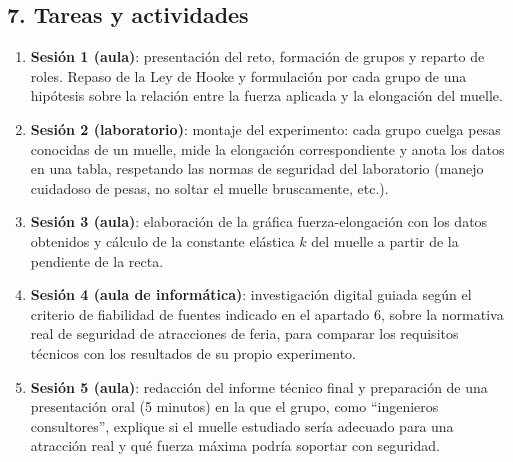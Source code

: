 \documentclass[11pt,a4paper]{article}
\begin{document}
\subsection*{7. Tareas y actividades}
\begin{enumerate}
    \item \textbf{Sesión 1 (aula)}: presentación del reto, formación de grupos y reparto de roles. Repaso de la Ley de Hooke y formulación por cada grupo de una hipótesis sobre la relación entre la fuerza aplicada y la elongación del muelle.
    \item \textbf{Sesión 2 (laboratorio)}: montaje del experimento: cada grupo cuelga pesas conocidas de un muelle, mide la elongación correspondiente y anota los datos en una tabla, respetando las normas de seguridad del laboratorio (manejo cuidadoso de pesas, no soltar el muelle bruscamente, etc.).
    \item \textbf{Sesión 3 (aula)}: elaboración de la gráfica fuerza-elongación con los datos obtenidos y cálculo de la constante elástica $k$ del muelle a partir de la pendiente de la recta.
    \item \textbf{Sesión 4 (aula de informática)}: investigación digital guiada según el criterio de fiabilidad de fuentes indicado en el apartado 6, sobre la normativa real de seguridad de atracciones de feria, para comparar los requisitos técnicos con los resultados de su propio experimento.
    \item \textbf{Sesión 5 (aula)}: redacción del informe técnico final y preparación de una presentación oral (5 minutos) en la que el grupo, como ``ingenieros consultores'', explique si el muelle estudiado sería adecuado para una atracción real y qué fuerza máxima podría soportar con seguridad.
\end{enumerate}
\end{document}
